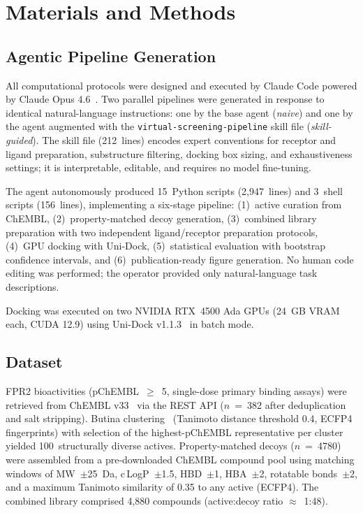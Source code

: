 \documentclass[10pt,a4paper,twocolumn]{article}
\newcommand{\NACTIVES}{100}
\newcommand{\NDECOYS}{4780}
\newcommand{\NSKILLLINES}{212}
\begin{document}
\section*{Materials and Methods}

\subsection*{Agentic Pipeline Generation}

All computational protocols were designed and executed by Claude Code powered by Claude Opus 4.6~\citep{claudecode2024}. Two parallel pipelines were generated in response to identical natural-language instructions: one by the base agent (\textit{naive}) and one by the agent augmented with the \texttt{virtual-screening-pipeline} skill file (\textit{skill-guided}). The skill file (\NSKILLLINES{}~lines) encodes expert conventions for receptor and ligand preparation, substructure filtering, docking box sizing, and exhaustiveness settings; it is interpretable, editable, and requires no model fine-tuning.

The agent autonomously produced 15~Python scripts (2,947~lines) and 3~shell scripts (156~lines), implementing a six-stage pipeline: (1)~active curation from ChEMBL, (2)~property-matched decoy generation, (3)~combined library preparation with two independent ligand/receptor preparation protocols, (4)~GPU docking with Uni-Dock, (5)~statistical evaluation with bootstrap confidence intervals, and (6)~publication-ready figure generation. No human code editing was performed; the operator provided only natural-language task descriptions.

Docking was executed on two NVIDIA RTX~4500 Ada GPUs (24~GB VRAM each, CUDA 12.9) using Uni-Dock v1.1.3~\citep{unidock2023} in batch mode.

\subsection*{Dataset}

FPR2 bioactivities (pChEMBL~$\geq$~5, single-dose primary binding assays) were retrieved from ChEMBL v33~\citep{chembl2024} via the REST API ($n$~=~382 after deduplication and salt stripping). Butina clustering~\citep{butina1999} (Tanimoto distance threshold 0.4, ECFP4 fingerprints) with selection of the highest-pChEMBL representative per cluster yielded \NACTIVES{}~structurally diverse actives. Property-matched decoys ($n$~=~\NDECOYS{}) were assembled from a pre-downloaded ChEMBL compound pool using matching windows of MW~$\pm$25~Da, c\,LogP~$\pm$1.5, HBD~$\pm$1, HBA~$\pm$2, rotatable bonds~$\pm$2, and a maximum Tanimoto similarity of 0.35 to any active (ECFP4). The combined library comprised 4,880 compounds (active:decoy ratio $\approx$~1:48).
\end{document}
